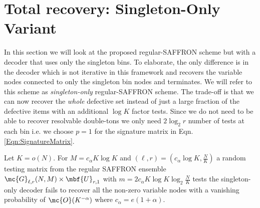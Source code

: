 \documentclass[conference,twocolumn]{IEEEtran}
\begin{document}
\section{Total recovery: Singleton-Only Variant}
\label{Sec:Singleton-only}
 In this section we will look at the proposed regular-SAFFRON scheme but with a decoder that uses only the singleton bins. To elaborate, the only difference is in the decoder which is not iterative in this framework and recovers the variable nodes connected to only the singleton bin nodes and terminates. We will refer to this scheme as \textit{singleton-only} regular-SAFFRON scheme. The trade-off is that we can now recover the \textit{whole} defective set instead of just a large fraction of the defective items with an additional $\log K$ factor tests. Since we do not need to be able to recover resolvable double-tons we only need $2\log_2 r$ number of tests at each bin i.e. we choose $p=1$ for the signature matrix in Eqn. \eqref{Eqn:SignatureMatrix}.
\begin{theorem}
Let $K=o(N)$. For $M=c_\alpha K \log K$ and $(\ell,r)=(c_\alpha \log K,\frac{N}{K})$ a random testing matrix from the regular SAFFRON ensemble $\mc{G}_{\ell,r}(N,M)\times \mbf{U}_{r,1}$ with $m=2c_\alpha K\log K \log_2 \frac{N}{K}$ tests the singleton-only decoder fails to recover all the non-zero variable nodes with a vanishing probability of $\mc{O}(K^{-\alpha})$ where $c_\alpha=e(1+\alpha)$.
\end{theorem}
\end{document}

